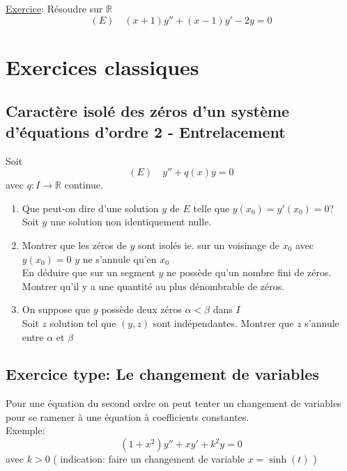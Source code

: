 \documentclass[10pt,a4paper]{article}
\theoremstyle{definition}
\begin{document}
\noindent \uline{Exercice}: Résoudre sur \(\mathbb{R}\)
\[(E) \quad (x + 1)y'' + (x - 1)y' - 2y = 0\]

\pagebreak

\section{Exercices classiques}
\subsection{Caractère isolé des zéros d'un système d'équations d'ordre 2 - Entrelacement}
\noindent Soit 
\[(E) \quad y'' + q(x)y = 0\]
avec \(q: I \to \mathbb{R}\) continue.
\begin{enumerate}
    \item Que peut-on dire d'une solution \(y\) de \(E\) telle que \(y(x_0) = y'(x_0) = 0\)? \\
    Soit \(y\) une solution non identiquement nulle.
    \item Montrer que les zéros de \(y\) sont isolés ie. sur un voisinage de \(x_0\) avec \(y(x_0) = 0\) \(y\) ne s'annule qu'en \(x_0\) \\ 
    En déduire que sur un segment \(y\) ne possède qu'un nombre fini de zéros. \\
    Montrer qu'il y a une quantité au plus dénombrable de zéros.
    \item On suppose que \(y\) possède deux zéros \(\alpha < \beta\) dans \(I\) \\
    Soit \(z\) solution tel que \((y, z)\) sont indépendantes. Montrer que \(z\) s'annule entre \(\alpha\) et \(\beta\)
\end{enumerate}

\subsection{Exercice type: Le changement de variables}
\noindent Pour une équation du second ordre on peut tenter un changement de variables pour se ramener à une équation à coefficients constantes. \\
Exemple:
\[(1 + x^2)y'' + xy' + k^2y = 0\]
avec \(k > 0\)
( indication: faire un changement de variable \(x = \sinh(t)\) )
\end{document}
